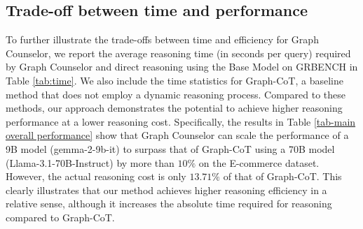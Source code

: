 \documentclass[11pt]{article}
\begin{document}
\subsection{Trade-off between time and performance}
To further illustrate the trade-offs between time and efficiency for Graph Counselor, we report the average reasoning time (in seconds per query) required by Graph Counselor and direct reasoning using the Base Model on GRBENCH in Table \ref{tab:time}. We also include the time statistics for Graph-CoT, a baseline method that does not employ a dynamic reasoning process. Compared to these methods, our approach demonstrates the potential to achieve higher reasoning performance at a lower reasoning cost. Specifically, the results in Table \ref{tab-main overall performance} show that Graph Counselor can scale the performance of a 9B model (gemma-2-9b-it) to surpass that of Graph-CoT using a 70B model (Llama-3.1-70B-Instruct) by more than $10\%$ on the E-commerce dataset. However, the actual reasoning cost is only $13.71\%$ of that of Graph-CoT. This clearly illustrates that our method achieves higher reasoning efficiency in a relative sense, although it increases the absolute time required for reasoning compared to Graph-CoT.
\end{document}
